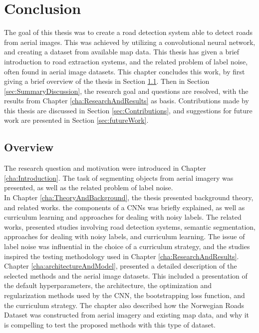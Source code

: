 \documentclass[a4paper]{book}
\begin{document}
\chapter{Conclusion}
\label{cha:evaluationAndConclusion}
The goal of this thesis was to create a road detection system able to detect roads from aerial images. This was achieved by utilizing a convolutional neural network, and creating a dataset from available map data. This thesis has given a brief introduction to road extraction systems, and the related problem of label noise, often found in aerial image datasets. This chapter concludes this work, by first giving a brief overview of the thesis in Section \ref{sec:summaryOverview}. Then in Section \ref{sec:SummaryDiscussion}, the research goal and questions are resolved, with the results from Chapter \ref{cha:ResearchAndResults} as basis. Contributions made by this thesis are discussed in Section \ref{sec:Contributions}, and suggestions for future work are presented in Section \ref{sec:futureWork}.\\

\section{Overview}
\label{sec:summaryOverview}
The research question and motivation were introduced in Chapter \ref{cha:Introduction}. The task of segmenting objects from aerial imagery was presented, as well as the related problem of label noise. \\

In Chapter \ref{cha:TheoryAndBackground}, the thesis presented background theory, and related works. the components of a \ac{CNN}s was briefly explained, as well as curriculum learning and approaches for dealing with noisy labels. The related works, presented studies involving road detection systems, semantic segmentation, approaches for dealing with noisy labels, and curriculum learning. The issue of label noise was influential in the choice of a curriculum strategy, and the studies inspired the testing methodology used in Chapter \ref{cha:ResearchAndResults}.\\

Chapter \ref{cha:architectureAndModel}, presented a detailed description of the selected methods and the aerial image datasets. This included a presentation of the default hyperparameters, the architecture, the optimization and regularization methods used by the \ac{CNN}, the bootstrapping loss function, and the curriculum strategy. The chapter also described how the Norwegian Roads Dataset was constructed from aerial imagery and existing map data, and why it is compelling to test the proposed methods with this type of dataset.\\
\end{document}
